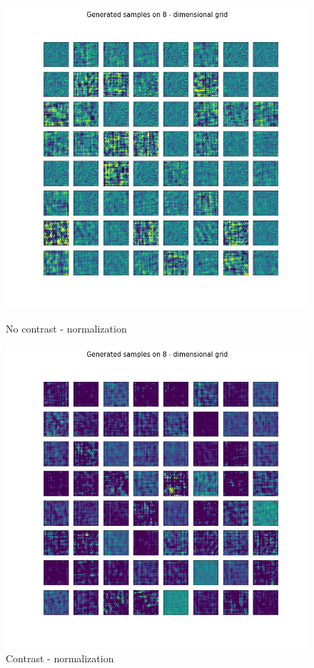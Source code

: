 \documentclass[12pt, english]{article}
\begin{document}
\begin{figure}[H]
\begin{minipage}{0.5\linewidth}
    \centering
    \includegraphics[width=.75\linewidth]{contrast/generated_samples_contrastNorm_noContrast.png} 
    \caption{No contrast - normalization} 
    \label{fig:contrast-generated-3} 
  \end{minipage}%
  \begin{minipage}{0.5\linewidth}
    \centering
    \includegraphics[width=.75\linewidth]{contrast/generated_samples_contrastNorm_contrast.png} 
    \caption{Contrast - normalization} 
    \label{fig:contrast-generated-4} 
  \end{minipage} 
\end{figure}

\vspace{4mm}
\end{document}
